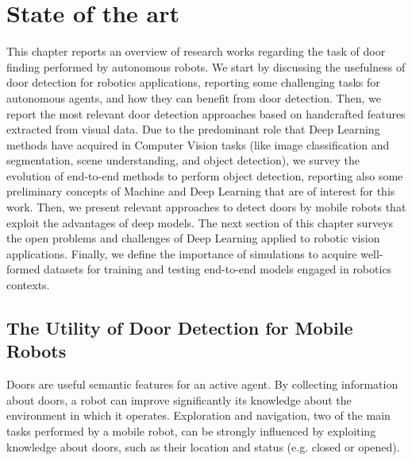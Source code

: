 \chapter{State of the art}
\label{sec:chapter2}
\thispagestyle{empty}

 This chapter reports an overview of research works regarding the task of door finding performed by autonomous robots. We start by discussing the usefulness of door detection for robotics applications, reporting some challenging tasks for autonomous agents, and how they can benefit from door detection. Then, we report the most relevant door detection approaches based on handcrafted features extracted from visual data. Due to the predominant role that Deep Learning methods have acquired in Computer Vision tasks (like image classification and segmentation, scene understanding, and object detection), we survey the evolution of end-to-end methods to perform object detection, reporting also some preliminary concepts of Machine and Deep Learning that are of interest for this work. Then, we present relevant approaches to detect doors by mobile robots that exploit the advantages of deep models. The next section of this chapter surveys the open problems and challenges of Deep Learning applied to robotic vision applications. Finally, we define the importance of simulations to acquire well-formed datasets for training and testing end-to-end models engaged in robotics contexts.  
 
 \section{The Utility of Door Detection for Mobile Robots}
 
 Doors are useful semantic features for an active agent. By collecting information about doors, a robot can improve significantly its knowledge about the environment in which it operates. Exploration and navigation, two of the main tasks performed by a mobile robot, can be strongly influenced by exploiting knowledge about doors, such as their location and status (e.g. closed or opened). 
 
